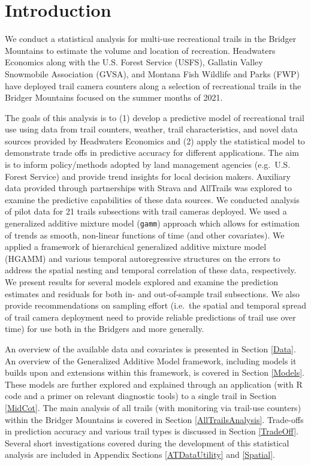 \documentclass[
]{book}
\begin{document}
\hypertarget{introduction}{%
\chapter{Introduction}\label{introduction}}

We conduct a statistical analysis for multi-use recreational trails in the Bridger Mountains to estimate the volume and location of recreation. Headwaters Economics along with the U.S. Forest Service (USFS), Gallatin Valley Snowmobile Association (GVSA), and Montana Fish Wildlife and Parks (FWP) have deployed trail camera counters along a selection of recreational trails in the Bridger Mountains focused on the summer months of 2021.

The goals of this analysis is to (1) develop a predictive model of recreational trail use using data from trail counters, weather, trail characteristics, and novel data sources provided by Headwaters Economics and (2) apply the statistical model to demonstrate trade offs in predictive accuracy for different applications. The aim is to inform policy/methods adopted by land management agencies (e.g.~U.S. Forest Service) and provide trend insights for local decision makers. Auxiliary data provided through partnerships with Strava and AllTrails was explored to examine the predictive capabilities of these data sources. We conducted analysis of pilot data for 21 trails subsections with trail cameras deployed. We used a generalized additive mixture model (\texttt{gamm}) approach which allows for estimation of trends as smooth, non-linear functions of time (and other covariates). We applied a framework of hierarchical generalized additive mixture model (HGAMM) \citep{pedersen2019hierarchical} and various temporal autoregressive structures on the errors to address the spatial nesting and temporal correlation of these data, respectively. We present results for several models explored and examine the prediction estimates and residuals for both in- and out-of-sample trail subsections. We also provide recommendations on sampling effort (i.e.~the spatial and temporal spread of trail camera deployment need to provide reliable predictions of trail use over time) for use both in the Bridgers and more generally.

An overview of the available data and covariates is presented in Section \ref{Data}. An overview of the Generalized Additive Model framework, including models it builds upon and extensions within this framework, is covered in Section \ref{Models}. These models are further explored and explained through an application (with R code and a primer on relevant diagnostic tools) to a single trail in Section \ref{MidCot}. The main analysis of all trails (with monitoring via trail-use counters) within the Bridger Mountains is covered in Section \ref{AllTrailsAnalysis}. Trade-offs in prediction accuracy and various trail types is discussed in Section \ref{TradeOff}. Several short investigations covered during the development of this statistical analysis are included in Appendix Sections \ref{ATDataUtility} and \ref{Spatial}.
\end{document}
